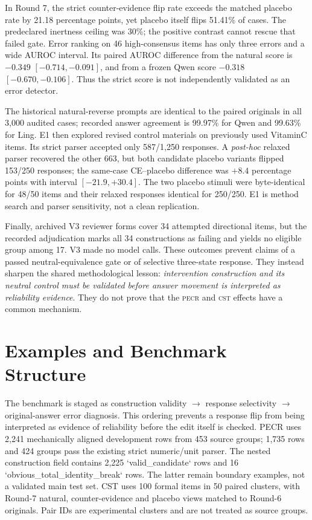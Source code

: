 \documentclass[11pt]{article}
\newcommand{\PECR}{\textsc{pecr}}
\newcommand{\CST}{\textsc{cst}}
\begin{document}
In Round 7, the strict counter-evidence flip rate exceeds the matched placebo rate by 21.18 percentage points, yet placebo itself flips 51.41\% of cases. The predeclared inertness ceiling was 30\%; the positive contrast cannot rescue that failed gate. Error ranking on 46 high-consensus items has only three errors and a wide AUROC interval. Its paired AUROC difference from the natural score is $-0.349$ $[-0.714,-0.091]$, and from a frozen Qwen score $-0.318$ $[-0.670,-0.106]$. Thus the strict score is not independently validated as an error detector.

The historical natural-reverse prompts are identical to the paired originals in all 3,000 audited cases; recorded answer agreement is 99.97\% for Qwen and 99.63\% for Ling. E1 then explored revised control materials on previously used VitaminC items. Its strict parser accepted only 587/1,250 responses. A \emph{post-hoc} relaxed parser recovered the other 663, but both candidate placebo variants flipped 153/250 responses; the same-case CE--placebo difference was $+8.4$ percentage points with interval $[-21.9,+30.4]$. The two placebo stimuli were byte-identical for 48/50 items and their relaxed responses identical for 250/250. E1 is method search and parser sensitivity, not a clean replication.

Finally, archived V3 reviewer forms cover 34 attempted directional items, but the recorded adjudication marks all 34 constructions as failing and yields no eligible group among 17. V3 made no model calls. These outcomes prevent claims of a passed neutral-equivalence gate or of selective three-state response. They instead sharpen the shared methodological lesson: \emph{intervention construction and its neutral control must be validated before answer movement is interpreted as reliability evidence}. They do not prove that the \PECR{} and \CST{} effects have a common mechanism.

\section{Examples and Benchmark Structure}
The benchmark is staged as construction validity $\rightarrow$ response selectivity $\rightarrow$ original-answer error diagnosis. This ordering prevents a response flip from being interpreted as evidence of reliability before the edit itself is checked. PECR uses 2,241 mechanically aligned development rows from 453 source groups; 1,735 rows and 424 groups pass the existing strict numeric/unit parser. The nested construction field contains 2,225 `valid_candidate` rows and 16 `obvious_total_identity_break` rows. The latter remain boundary examples, not a validated main test set. CST uses 100 formal items in 50 paired clusters, with Round-7 natural, counter-evidence and placebo views matched to Round-6 originals. Pair IDs are experimental clusters and are not treated as source groups.
\end{document}
